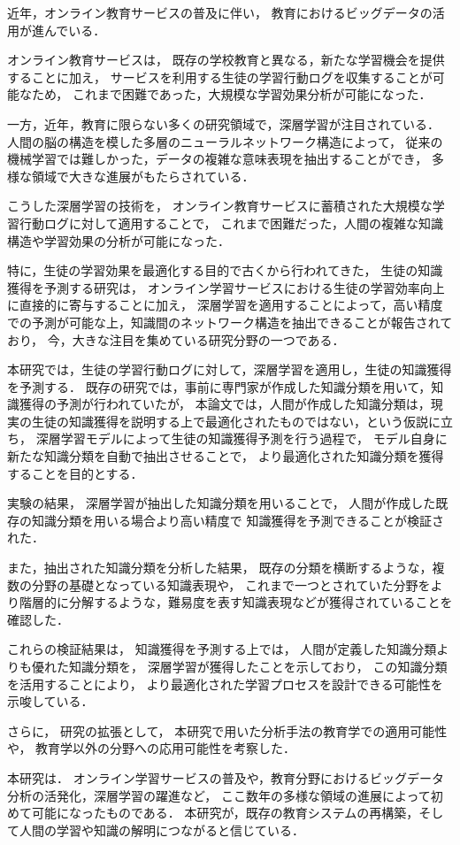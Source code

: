 近年，オンライン教育サービスの普及に伴い，
教育におけるビッグデータの活用が進んでいる．

オンライン教育サービスは，
既存の学校教育と異なる，新たな学習機会を提供することに加え，
サービスを利用する生徒の学習行動ログを収集することが可能なため，
これまで困難であった，大規模な学習効果分析が可能になった．


一方，近年，教育に限らない多くの研究領域で，深層学習が注目されている．
人間の脳の構造を模した多層のニューラルネットワーク構造によって，
従来の機械学習では難しかった，データの複雑な意味表現を抽出することができ，
多様な領域で大きな進展がもたらされている．

こうした深層学習の技術を，
オンライン教育サービスに蓄積された大規模な学習行動ログに対して適用することで，
これまで困難だった，人間の複雑な知識構造や学習効果の分析が可能になった．

特に，生徒の学習効果を最適化する目的で古くから行われてきた，
生徒の知識獲得を予測する研究は，
オンライン学習サービスにおける生徒の学習効率向上に直接的に寄与することに加え，
深層学習を適用することによって，高い精度での予測が可能な上，知識間のネットワーク構造を抽出できることが報告されており，
今，大きな注目を集めている研究分野の一つである．


本研究では，生徒の学習行動ログに対して，深層学習を適用し，生徒の知識獲得を予測する．
既存の研究では，事前に専門家が作成した知識分類を用いて，知識獲得の予測が行われていたが，
本論文では，人間が作成した知識分類は，現実の生徒の知識獲得を説明する上で最適化されたものではない，という仮説に立ち，
深層学習モデルによって生徒の知識獲得予測を行う過程で，
モデル自身に新たな知識分類を自動で抽出させることで，
より最適化された知識分類を獲得することを目的とする．

実験の結果，
深層学習が抽出した知識分類を用いることで，
人間が作成した既存の知識分類を用いる場合より高い精度で
知識獲得を予測できることが検証された．

また，抽出された知識分類を分析した結果，
既存の分類を横断するような，複数の分野の基礎となっている知識表現や，
これまで一つとされていた分野をより階層的に分解するような，難易度を表す知識表現などが獲得されていることを確認した．

これらの検証結果は，
知識獲得を予測する上では，
人間が定義した知識分類よりも優れた知識分類を，
深層学習が獲得したことを示しており，
この知識分類を活用することにより，
より最適化された学習プロセスを設計できる可能性を示唆している．

さらに，
研究の拡張として，
本研究で用いた分析手法の教育学での適用可能性や，
教育学以外の分野への応用可能性を考察した．


本研究は．
オンライン学習サービスの普及や，教育分野におけるビッグデータ分析の活発化，深層学習の躍進など，
ここ数年の多様な領域の進展によって初めて可能になったものである．
本研究が，既存の教育システムの再構築，そして人間の学習や知識の解明につながると信じている．


